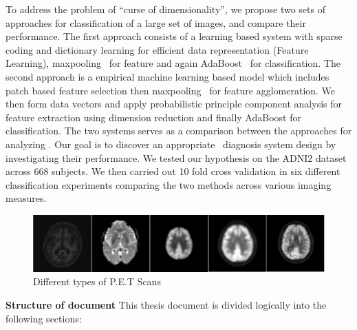 To address the problem of ``curse of dimensionality'', we propose two sets of approaches for classification of a large set of \FDGPET images, and compare their performance. The first approach consists of a learning based system with sparse coding and dictionary learning for efficient data representation (Feature Learning), maxpooling~\citep{boureau2010theoretical} for feature and again AdaBoost~\citep{rojas2009adaboost} for classification. The second approach is a empirical machine learning based model which includes patch based feature selection then maxpooling~\citep{boureau2010theoretical} for feature agglomeration. We then form data vectors and apply probabilistic principle component analysis for feature extraction using dimension reduction and finally AdaBoost for classification. The two systems serves as a comparison between the approaches for analyzing \FDGPET. Our goal is to discover an appropriate \FDGPET ~diagnosis system design by investigating their performance. We tested our hypothesis on the ADNI2 dataset across $668$ subjects. We then carried out 10 fold cross validation in six different classification experiments comparing the two methods across various imaging measures.

\begin{figure}[h]
	\centering
	\includegraphics[width=\linewidth]{figures/pet_raw.png}
	\caption{Different types of P.E.T Scans}
	\label{fig:pet_raw}
\end{figure}

{\bf Structure of document} This thesis document is divided logically into the following sections:

